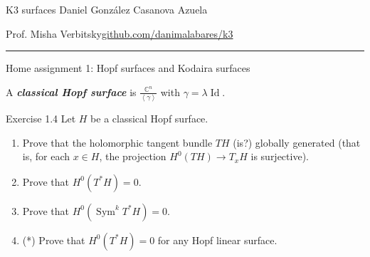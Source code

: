 

\usepackage[style=authortitle-terse,backend=bibtex]{biblatex}


\setcounter{secnumdepth}{2}



\begin{minipage}{\textwidth}
	\begin{minipage}{1\textwidth}
		K3 surfaces \hfill Daniel González Casanova Azuela
		
		{\small Prof. Misha Verbitsky\hfill\href{https://github.com/danimalabares/k3}{github.com/danimalabares/k3}}
	\end{minipage}
\end{minipage}\vspace{.2cm}\hrule

\vspace{10pt}
{\huge Home assignment 1: Hopf surfaces and Kodaira surfaces}

\begin{defn}\leavevmode
	A \textit{\textbf{classical Hopf surface}} is \(\frac{\mathbb{C}^n}{\left<\gamma\right>}\) with %
	\(\gamma=\lambda \operatorname{Id}\).

\end{defn}

\begin{thing4}{Exercise 1.4}\label{exer:1.4}\leavevmode
Let \(H\) be a classical Hopf surface.
\begin{enumerate}[label=(\alph*)]
\item Prove that the holomorphic tangent bundle \(TH\) {\color{4}(is?)} globally generated (that is, for each \(x \in H\), the projection \(H^{0}(TH)\longrightarrow T_xH\) is surjective).
 \item Prove that \(H^{0}(T^*H)=0\).
\item Prove that \(H^{0}(\operatorname{Sym}^k T^* H)=0\).
\item (*) Prove that \(H^{0}(T^*H)=0\) for any Hopf linear surface.
\end{enumerate}
\end{thing4}

